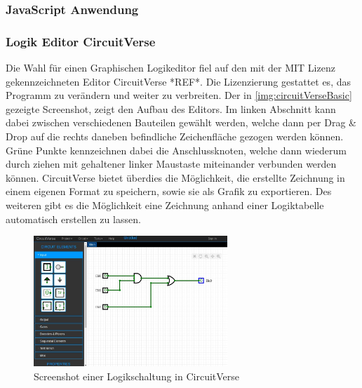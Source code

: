 \subsubsection{JavaScript Anwendung}
\subsubsection{Logik Editor CircuitVerse}
Die Wahl für einen Graphischen Logikeditor fiel auf den mit der MIT Lizenz gekennzeichneten Editor CircuitVerse *REF*. Die Lizenzierung gestattet es, das Programm zu verändern und weiter zu verbreiten. Der in \autoref{img:circuitVerseBasic} gezeigte Screenshot, zeigt den Aufbau des Editors. Im linken Abschnitt kann dabei zwischen verschiedenen Bauteilen gewählt werden, welche dann per Drag \& Drop auf die rechts daneben befindliche Zeichenfläche gezogen werden können. Grüne Punkte kennzeichnen dabei die Anschlussknoten, welche dann wiederum durch ziehen mit gehaltener linker Maustaste miteinander verbunden werden können. CircuitVerse bietet überdies die Möglichkeit, die erstellte Zeichnung in einem eigenen Format zu  speichern, sowie sie als Grafik zu exportieren. Des weiteren gibt es die Möglichkeit eine Zeichnung anhand einer Logiktabelle automatisch erstellen zu lassen. 

\begin{figure}[H]
	\begin{center}
		\includegraphics[width=0.65\textwidth ,clip]{./images/circuitverse.jpg}
		\caption{Screenshot einer Logikschaltung in CircuitVerse}
		\label{img:circuitVerseBasic}
	\end{center} 
\end{figure}	

